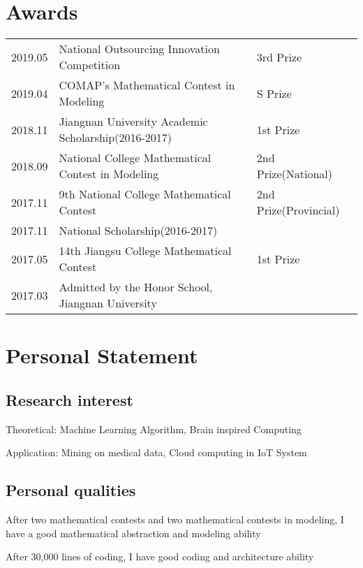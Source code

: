 \documentclass[]{deedy-resume-openfont}
\begin{document}
\begin{minipage}[t]{0.73\textwidth}
\section{Awards} 
\begin{tabular}{lll}
    2019.05 & National Outsourcing Innovation Competition & 3rd Prize \\
    2019.04 & COMAP's Mathematical Contest in Modeling & S Prize \\
    2018.11 & Jiangnan University Academic Scholarship(2016-2017) & 1st Prize \\
    2018.09 & National College Mathematical Contest in Modeling & 2nd Prize(National) \\
    2017.11 & 9th National College Mathematical Contest & 2nd Prize(Provincial) \\
    2017.11 & National Scholarship(2016-2017) & \\
    2017.05 & 14th Jiangsu College Mathematical Contest & 1st Prize\\
    2017.03 & Admitted by the Honor School, Jiangnan University& \\
\end{tabular}
\sectionsep

\section{Personal Statement}
\subsection{Research interest}
    \vspace{\topsep}
	\begin{tightemize}
		\item Theoretical: Machine Learning Algorithm, Brain inspired Computing
		\item Application: Mining on medical data, Cloud computing in IoT System
	\end{tightemize}
    \subsection{Personal qualities}
    \vspace{\topsep}
    \begin{tightemize}
        \item After two mathematical contests and two mathematical contests in modeling, I have a good mathematical abstraction and modeling ability
		\item After 30,000 lines of coding, I have good coding and architecture ability
	\end{tightemize}

\end{minipage} 
\end{document}
